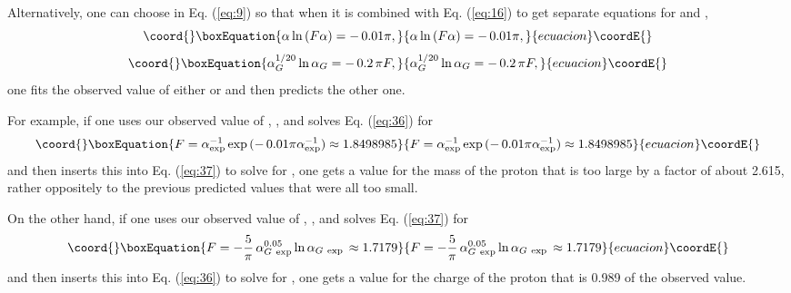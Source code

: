 \documentclass[a4paper,12pt]{article}
\begin{document}
	Alternatively, one can choose \coordHE{} in Eq. (\ref{eq:9})
so that when it is combined with Eq. (\ref{eq:16})
to get separate equations for \myHighlight{$\alpha$}\coordHE{} and \coordHE{},
 \begin{equation}\coord{}\boxEquation{
 \alpha\ln{(F\alpha)} = -\,0.01\pi,
 \label{eq:36}
 }{
 \alpha\ln{(F\alpha)} = -\,0.01\pi,
 }{ecuacion}\coordE{}\end{equation}
 \begin{equation}\coord{}\boxEquation{
 \alpha_G^{1/20}\ln{\alpha_G} = -\,0.2\,\pi F,
 \label{eq:37}
 }{
 \alpha_G^{1/20}\ln{\alpha_G} = -\,0.2\,\pi F,
 }{ecuacion}\coordE{}\end{equation}
one fits the observed value of either \myHighlight{$\alpha$}\coordHE{} or \coordHE{}
and then predicts the other one.

	For example, if one uses our observed value of \coordHE{},
\coordHE{} \cite{PDG},
and solves Eq. (\ref{eq:36}) for
 \begin{equation}\coord{}\boxEquation{
 F = \alpha_{\mathrm{exp}}^{-1}\exp{(-\,0.01\pi\alpha_{\mathrm{exp}}^{-1})}
   \approx 1.8498985
 \label{eq:38}
 }{
 F = \alpha_{\mathrm{exp}}^{-1}\exp{(-\,0.01\pi\alpha_{\mathrm{exp}}^{-1})}
   \approx 1.8498985
 }{ecuacion}\coordE{}\end{equation}
and then inserts this into Eq. (\ref{eq:37})
to solve for \coordHE{},
one gets a value for the mass of the proton that
is too large by a factor of about 2.615,
rather oppositely to the previous predicted values
that were all too small.

	On the other hand, if one uses our observed value of \coordHE{},
\coordHE{} \cite{PDG},
and solves Eq. (\ref{eq:37}) for
 \begin{equation}\coord{}\boxEquation{
 F = -{5\over\pi}\,\alpha_{G\ \mathrm{exp}}^{0.05}
      \ln{\alpha_{G\ \mathrm{exp}}}
   \, \approx 1.7179
 \label{eq:39}
 }{
 F = -{5\over\pi}\,\alpha_{G\ \mathrm{exp}}^{0.05}
      \ln{\alpha_{G\ \mathrm{exp}}}
   \, \approx 1.7179
 }{ecuacion}\coordE{}\end{equation}
and then inserts this into Eq. (\ref{eq:36})
to solve for \coordHE{},
one gets a value for the charge of the proton
that is 0.989 of the observed value.
\end{document}
